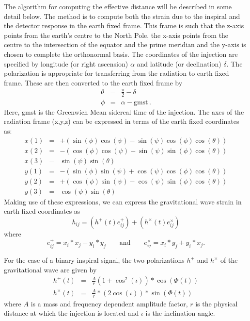 \begin{entry}
The algorithm for computing the effective distance will be described in some
detail below.  The method is to compute both the strain due to the inspiral
and the detector response in the earth fixed frame.  This frame is such that
the z-axis points from the earth's centre to the North Pole, the x-axis points
from the centre to the intersection of the equator and the prime meridian and
the y-axis is chosen to complete the orthonormal basis.  The coordinates of
the injection are specified by longitude (or right ascension) $\alpha$ and
latitude (or declination) $\delta$.  The polarization is appropriate for
transferring from the radiation to earth fixed frame.  These are then
converted to the earth fixed frame by
%
\begin{eqnarray}
  \theta &=& \frac{\pi}{2} - \delta \\
  \phi &=& \alpha - \textrm{gmst} \, .
\end{eqnarray}
%
Here, gmst is the Greenwich Mean sidereal time of the injection.  The axes of
the radiation frame (x,y,z) can be expressed in terms of the earth fixed
coordinates as:
%
\begin{eqnarray}
  x(1) &=& +( \sin( \phi ) \cos( \psi ) - \sin( \psi ) \cos( \phi ) 
      \cos( \theta ) ) \nonumber \\
  x(2) &=& -( \cos( \phi ) \cos( \psi ) + \sin( \psi ) \sin( \phi ) 
      \cos( \theta ) ) \nonumber \\
  x(3) &=& \sin( \psi ) \sin( \theta ) \label{xrad}\\
  y(1) &=& -( \sin( \phi ) \sin( \psi ) + \cos( \psi ) \cos( \phi ) 
      \cos( \theta ) ) \nonumber\\
  y(2) &=& +( \cos( \phi ) \sin( \psi ) - \cos( \psi ) \sin( \phi ) 
      \cos( \theta ) ) \nonumber \\
  y(3) &=& \cos( \psi ) \sin( \theta ) \label{yrad}
\end{eqnarray}
%
Making use of these expressions, we can express the gravitational wave strain in
earth fixed coordinates as
%
\begin{equation}\label{hij}
  h_{ij} = ( h^{+}(t) e^{+}_{ij} ) + (h^{\times}(t) e^{\times}_{ij})
\end{equation}
%
where
%
\begin{equation}
  e^{+}_{ij} = x_{i} * x_{j} - y_{i} * y_{j} \qquad \mathrm{and} \qquad
  e^{\times}_{ij} = x_{i} * y_{j} + y_{i} * x_{j}.
\end{equation}
%

For the case of a binary inspiral signal, the two polarizations $h^{+}$
and $h^{\times}$ of the gravitational wave are given by
%
\begin{eqnarray}
  h^{+}(t)  &=& \frac{A}{r}  ( 1 + \cos^2 ( \iota ) ) * \cos( \Phi(t) ) \\
  h^{\times}(t) &=& \frac{A}{r} * ( 2 \cos( \iota )   ) * \sin( \Phi(t) )
\end{eqnarray}
%    
where $A$ is a mass and frequency dependent amplitude factor, $r$ is the
physical distance at which the injection is located and $\iota$ is the
inclination angle.


\end{entry}
